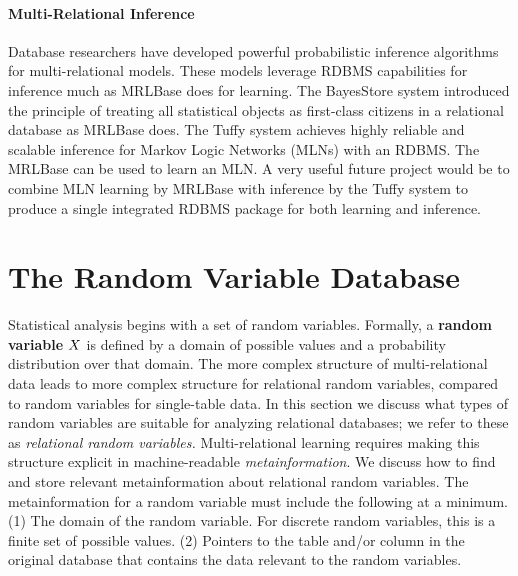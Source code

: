 \documentclass{acm_proc_article-sp}
\begin{document}
\paragraph{Multi-Relational Inference} 
Database researchers have developed powerful probabilistic inference  algorithms for multi-relational models. These models leverage RDBMS capabilities for inference much as MRLBase does for learning. The BayesStore system \cite{Wang2008} introduced the principle of treating all statistical objects as first-class citizens in a relational database as MRLBase does. The Tuffy system \cite{DBLP:journals/pvldb/NiuRDS11} achieves highly reliable and scalable inference for Markov Logic Networks (MLNs) with an RDBMS. The MRLBase can be used to learn an MLN. A very useful future project would be to combine MLN learning by MRLBase with inference by the Tuffy system to produce a single integrated RDBMS package for both learning and inference. 



\section{The Random Variable Database} 
Statistical analysis begins with a set of random variables. Formally, a \textbf{random variable} $X$ is defined by a domain of possible values and a probability distribution over that domain. The more complex structure of multi-relational data leads to more complex structure for relational random variables, compared to random variables for single-table data.  
 In this section we discuss what types of random variables are suitable for analyzing relational databases; we refer to these as {\em relational random variables.} 
Multi-relational learning requires making this structure explicit in machine-readable {\em metainformation}. We discuss how to find and store relevant metainformation about relational random variables. The metainformation for a random variable must include the following at a minimum.
(1) The domain of the random variable. For discrete random variables, this is a finite set of possible values.
(2) Pointers to the table and/or column in the original database that contains the data relevant to the random variables. 
\end{document}
